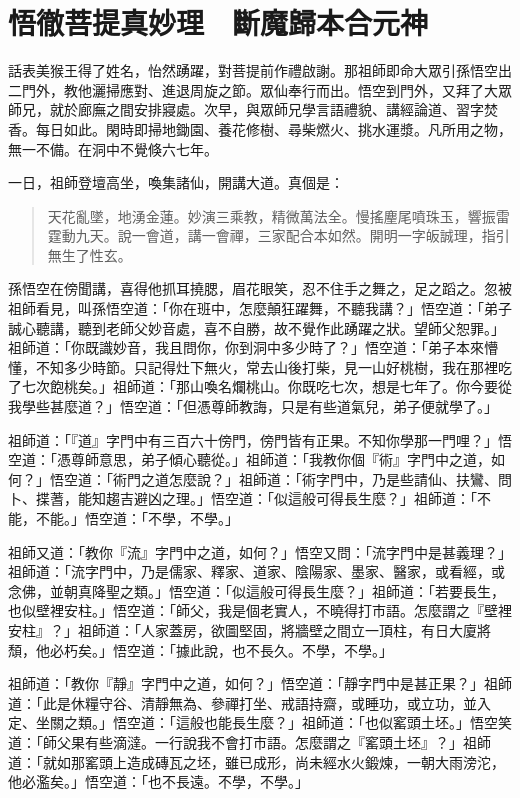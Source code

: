 
\chapter{悟徹菩提真妙理　斷魔歸本合元神}

話表美猴王得了姓名，怡然踴躍，對菩提前作禮啟謝。那祖師即命大眾引孫悟空出二門外，教他灑掃應對、進退周旋之節。眾仙奉行而出。悟空到門外，又拜了大眾師兄，就於廊廡之間安排寢處。次早，與眾師兄學言語禮貌、講經論道、習字焚香。每日如此。閑時即掃地鋤園、養花修樹、尋柴燃火、挑水運漿。凡所用之物，無一不備。在洞中不覺倏六七年。

一日，祖師登壇高坐，喚集諸仙，開講大道。真個是：
\begin{quote}
天花亂墜，地湧金蓮。妙演三乘教，精微萬法全。慢搖麈尾噴珠玉，響振雷霆動九天。說一會道，講一會禪，三家配合本如然。開明一字皈誠理，指引無生了性玄。
\end{quote}

孫悟空在傍聞講，喜得他抓耳撓腮，眉花眼笑，忍不住手之舞之，足之蹈之。忽被祖師看見，叫孫悟空道：「你在班中，怎麼顛狂躍舞，不聽我講？」悟空道：「弟子誠心聽講，聽到老師父妙音處，喜不自勝，故不覺作此踴躍之狀。望師父恕罪。」祖師道：「你既識妙音，我且問你，你到洞中多少時了？」悟空道：「弟子本來懵懂，不知多少時節。只記得灶下無火，常去山後打柴，見一山好桃樹，我在那裡吃了七次飽桃矣。」祖師道：「那山喚名爛桃山。你既吃七次，想是七年了。你今要從我學些甚麼道？」悟空道：「但憑尊師教誨，只是有些道氣兒，弟子便就學了。」

祖師道：「『道』字門中有三百六十傍門，傍門皆有正果。不知你學那一門哩？」悟空道：「憑尊師意思，弟子傾心聽從。」祖師道：「我教你個『術』字門中之道，如何？」悟空道：「術門之道怎麼說？」祖師道：「術字門中，乃是些請仙、扶鸞、問卜、揲蓍，能知趨吉避凶之理。」悟空道：「似這般可得長生麼？」祖師道：「不能，不能。」悟空道：「不學，不學。」

祖師又道：「教你『流』字門中之道，如何？」悟空又問：「流字門中是甚義理？」祖師道：「流字門中，乃是儒家、釋家、道家、陰陽家、墨家、醫家，或看經，或念佛，並朝真降聖之類。」悟空道：「似這般可得長生麼？」祖師道：「若要長生，也似壁裡安柱。」悟空道：「師父，我是個老實人，不曉得打市語。怎麼謂之『壁裡安柱』？」祖師道：「人家蓋房，欲圖堅固，將牆壁之間立一頂柱，有日大廈將頹，他必朽矣。」悟空道：「據此說，也不長久。不學，不學。」

祖師道：「教你『靜』字門中之道，如何？」悟空道：「靜字門中是甚正果？」祖師道：「此是休糧守谷、清靜無為、參禪打坐、戒語持齋，或睡功，或立功，並入定、坐關之類。」悟空道：「這般也能長生麼？」祖師道：「也似窰頭土坯。」悟空笑道：「師父果有些滴澾。一行說我不會打市語。怎麼謂之『窰頭土坯』？」祖師道：「就如那窰頭上造成磚瓦之坯，雖已成形，尚未經水火鍛煉，一朝大雨滂沱，他必濫矣。」悟空道：「也不長遠。不學，不學。」


